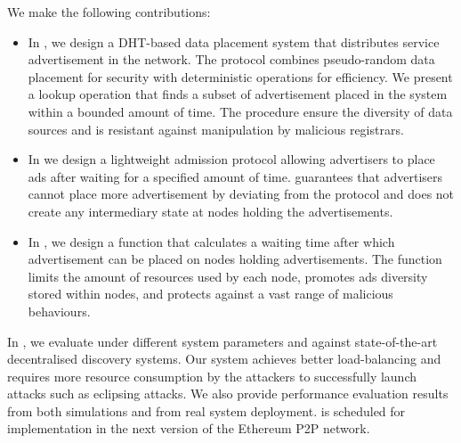  We make the following contributions:
\begin{itemize}
    \item In , we design a DHT-based data placement system that distributes service advertisement in the network. The protocol combines pseudo-random data placement for security with deterministic operations for efficiency. We present a lookup operation that finds a subset of advertisement placed in the system within a bounded amount of time. The procedure ensure the diversity of data sources and is resistant against manipulation by malicious registrars. 
    \item In  we design a lightweight admission protocol allowing advertisers to place ads after waiting for a specified amount of time. \sysname guarantees that advertisers cannot place more advertisement by deviating from the protocol and does not create any intermediary state at nodes holding the advertisements. 
    \item In , we design a function that calculates a waiting time after which advertisement can be placed on nodes holding advertisements. The function limits the amount of resources used by each node, promotes ads diversity stored within nodes, and protects against a vast range of malicious behaviours. 
\end{itemize}

In , we evaluate \sysname under different system parameters and against state-of-the-art decentralised discovery systems. Our system achieves better load-balancing and requires more resource consumption by the attackers to successfully launch attacks such as eclipsing attacks. We also provide performance evaluation results from both simulations and from real system deployment. \sysname is scheduled for implementation in the next version of the Ethereum P2P network. 




